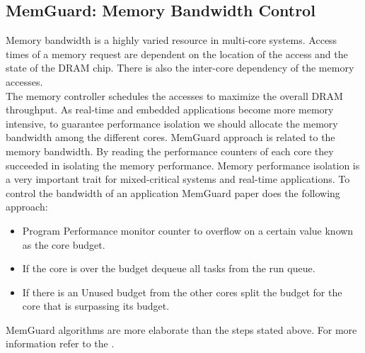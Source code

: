 \documentclass[a4paper, 11pt, twocolumn]{article}
\theoremstyle{nonumberplain}
\begin{document}
\subsection{MemGuard: Memory Bandwidth Control}
Memory bandwidth is a highly varied resource in multi-core systems.
Access times of a memory request are dependent on the location of the access
and the state of the DRAM chip. There is also the inter-core dependency of the
memory accesses. \\
The memory controller schedules the accesses to maximize the overall DRAM
throughput.
As real-time and embedded applications become more memory intensive, to
guarantee performance isolation we should allocate the memory bandwidth
among the different cores. MemGuard \cite{memguard} approach is related to
the memory bandwidth. By reading the performance counters of each core they
succeeded in isolating the memory performance. Memory performance isolation is
a very important trait for mixed-critical systems and real-time applications.
To control the bandwidth of an application MemGuard paper does
the following approach:
\begin{itemize}
    \item Program Performance monitor counter to overflow on a certain value
        known as the core budget.
    \item If the core is over the budget dequeue all tasks from the run queue.
    \item If there is an Unused budget from the other cores split the budget for
        the core that is surpassing its budget.
\end{itemize}
MemGuard algorithms are more elaborate than the steps stated above. For
more information refer to the \cite{memguard}.
\end{document}
